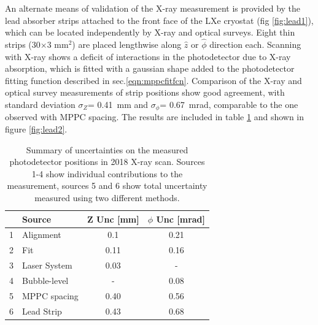 An alternate means of validation of the X-ray measurement is
provided by the lead absorber strips attached to the front face
of the LXe cryostat (fig \ref{fig:lead1}), which can be located
independently by X-ray and optical surveys.  Eight thin strips
(30$\times$3 mm$^2$) are placed lengthwise along $\hat{z}$ or
$\hat{\phi}$ direction each.  Scanning with X-ray shows a deficit
of interactions in the photodetector due to X-ray absorption,
which is fitted with a gaussian shape added to the photodetector
fitting function described in sec.\ref{eqn:mppcfitfcn}.
Comparison of the X-ray and optical survey measurements of strip
positions show good agreement, with standard deviation
$\sigma_Z$= 0.41~mm and $\sigma_\phi$= 0.67~mrad, comparable to
the one observed with MPPC spacing.  The results are included in
table \ref{tab:uncertainties} and shown in figure \ref{fig:lead2}.

\begin{table}
\begin{tabular}{clcc}
 & Source & Z Unc [mm] & $\phi$ Unc [mrad] \\
  \hline
1& Alignment      & 0.1  & 0.21  \\
2& Fit           &  0.11 & 0.16  \\
3& Laser System  &  0.03 &  - \\
4& Bubble-level  &  -    & 0.08 \\
5& MPPC spacing  & 0.40  & 0.56 \\
6& Lead Strip   &  0.43  & 0.68 \\
\end{tabular}
\caption{Summary of uncertainties on the measured photodetector
positions in 2018 X-ray scan. Sources 1-4 show individual
contributions to the measurement, sources 5 and 6 show
total uncertainty measured using two different methods.
}
\label{tab:uncertainties}
\end{table}

